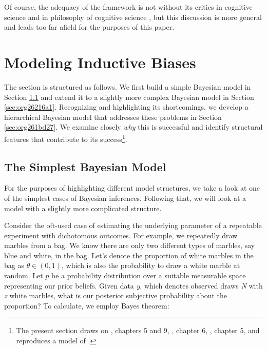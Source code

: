 \documentclass[11pt, a4paper]{article}
\begin{document}
Of course, the adequacy of the framework is not without its critics in cognitive
science \citep{mcclelland10_approac_lettin} and in philosophy of cognitive
science \citep{colombo16_bayes_cognit_scien_monop_neglec_framew}, but this
discussion is more general and leads too far afield for the purposes of this
paper.

\section{Modeling Inductive Biases}
\label{sec:orga764b3c}

The section is structured as follows. We first build a simple Bayesian model in
Section \ref{sec:orgcc8b92d} and extend it to a slightly more complex Bayesian
model in Section \ref{sec:org26216a1}. Recognizing and highlighting its
shortcomings, we develop a hierarchical Bayesian model that addresses these
problems in Section \ref{sec:org261bd27}. We examine closely \emph{why} this is
successful and identify structural features that contribute to its
success\footnote{The present section draws on \citet{kruschke11_doing_bayes},
  chapters 5 and 9, \citet{jaynes03_probab_theor}, chapter 6,
  \citet{gelman13_bayes_data_analy_third_edition}, chapter 5, and reproduces a
  model of \citet{kemp07_learn_overh_with_hierar_bayes_model}.}.
\subsection{The Simplest Bayesian Model}
\label{sec:orgcc8b92d}

For the purposes of highlighting different model structures, we take a look at
one of the simplest cases of Bayesian inferences. Following that, we will look
at a model with a slightly more complicated structure.

Consider the oft-used case of estimating the underlying parameter of a
repeatable experiment with dichotomous outcomes. For example, we repeatedly draw
marbles from a bag. We know there are only two different types of marbles, say
blue and white, in the bag. Let's denote the proportion of white marbles in the
bag as \(\theta \in (0,1)\), which is also the probability to draw a white
marble at random. Let \(p\) be a probability distribution over a suitable
measurable space representing our prior beliefs. Given data \emph{y}, which
denotes observed draws \emph{N} with \emph{z}
white marbles, what is our posterior subjective probability about the
proportion? To calculate, we employ Bayes theorem:
\end{document}
